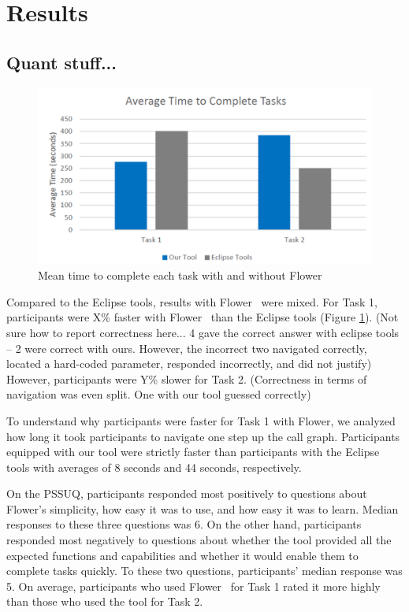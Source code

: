 \documentclass[conference]{IEEEtran}
\newcommand{\toolName}{Flower}
\begin{document}
\section{Results}
\subsection{Quant stuff...}
\begin{figure}
	\centering
	\includegraphics[width=\columnwidth]{images/taskTime}
	\caption{Mean time to complete each task with and without \toolName}
	\label{fig:taskTime} 
\end{figure}


Compared to the Eclipse tools, results with \toolName~ were mixed.
For Task 1, participants were X\% faster with \toolName~ than the Eclipse tools (Figure \ref{fig:taskTime}). 
(Not sure how to report correctness here... 4 gave the correct answer with eclipse tools --
2 were correct with ours. However, the incorrect two navigated correctly, located a hard-coded parameter, responded incorrectly, and did not justify)
However, participants were Y\% slower for Task 2.
(Correctness in terms of navigation was even split. One with our tool guessed correctly)

To understand why participants were faster for Task 1 with \toolName, we analyzed how long it took participants to navigate one step up the call graph. Participants equipped with our tool were strictly faster than participants with the Eclipse tools with averages of 8 seconds and 44 seconds, respectively. 

On the PSSUQ, participants responded most positively to questions about \toolName's simplicity, how easy it was to use, and how easy it was to learn. 
Median responses to these three questions was 6.
On the other hand, participants responded most negatively to questions about whether the tool provided all the expected functions and capabilities and whether it would enable them to complete tasks quickly.
To these two questions, participants' median response was 5. 
On average, participants who used \toolName~ for Task 1 rated it more highly than those who used the tool for Task 2.
\end{document}
